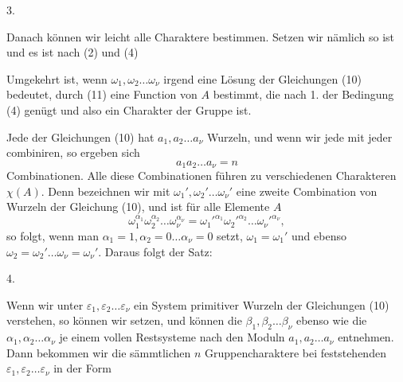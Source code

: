 
3. 

Danach können wir leicht alle Charaktere bestimmen. Setzen wir nämlich
so ist
und es ist nach (2) und (4)

Umgekehrt ist, wenn $\omega_1, \omega_2 \ldots \omega_\nu$ irgend eine Lösung der Gleichungen (10) bedeutet, durch (11) eine Function von $A$ bestimmt, die nach 1. der Bedingung (4) genügt und also ein Charakter der Gruppe ist.

Jede der Gleichungen (10) hat $a_1, a_2 \ldots a_\nu$ Wurzeln, und wenn wir jede mit jeder combiniren, so ergeben sich
\[
a_1 a_2 \ldots a_\nu = n
\]
Combinationen. Alle diese Combinationen führen zu verschiedenen Charakteren $\chi(A)$. Denn bezeichnen wir mit $\omega_1', \omega_2' \ldots \omega_\nu'$ eine zweite Combination von Wurzeln der Gleichung (10), und ist für alle Elemente $A$
\[
\omega_1^{\alpha_1}\omega_2^{\alpha_2}\ldots\omega_\nu^{\alpha_\nu} = \omega_1'^{\alpha_1}\omega_2'^{\alpha_2}\ldots\omega_\nu'^{\alpha_\nu},
\]
so folgt, wenn man $\alpha_1 = 1, \alpha_2 = 0 \ldots \alpha_\nu = 0$ setzt, $\omega_1 = \omega_1'$ und ebenso $\omega_2 = \omega_2' \ldots \omega_\nu = \omega_\nu'$. Daraus folgt der Satz:

4. 

Wenn wir unter $\varepsilon_1, \varepsilon_2 \ldots \varepsilon_\nu$ ein System primitiver Wurzeln der Gleichungen (10) verstehen, so können wir
setzen, und können die $\beta_1, \beta_2 \ldots \beta_\nu$ ebenso wie die $\alpha_1, \alpha_2 \ldots \alpha_\nu$ je einem vollen Restsysteme nach den Moduln $a_1, a_2 \ldots a_\nu$ entnehmen. Dann bekommen wir die sämmtlichen $n$ Gruppencharaktere bei feststehenden $\varepsilon_1, \varepsilon_2 \ldots \varepsilon_\nu$ in der Form
